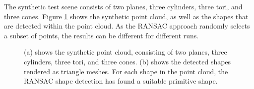 The synthetic test scene consists of two planes, three cylinders, three tori, and three cones.  Figure \ref{fig:synthetic_point_cloud_results} shows the synthetic point cloud, as well as the shapes that are detected within the point cloud. As the RANSAC approach randomly selects a subset of points, the results can be different for different runs. 

\begin{figure}[h]
\centering
{}
\caption[Rendering of the synthetic point cloud in (a), rendering of the detected shapes in (b)]
{(a) shows the synthetic point cloud, consisting of two planes, three cylinders, three tori, and three cones. (b) shows the detected shapes rendered as triangle meshes. For each shape in the point cloud, the RANSAC shape detection has found a suitable primitive shape. }
\label{fig:synthetic_point_cloud_results}
\end{figure}

